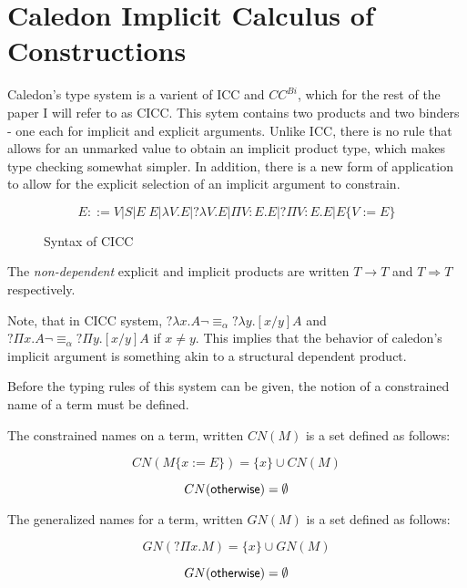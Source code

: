 \section{Caledon Implicit Calculus of Constructions}

Caledon's type system is a varient of ICC and $CC^{Bi}$, 
which for the rest of the paper I will refer to as CICC.  
This sytem contains two products and two binders - one each for implicit and explicit arguments. 
Unlike ICC, there is no rule that allows for an unmarked value to obtain an implicit product type, which
makes type checking somewhat simpler.  
In addition, there is a new form of application to allow for the explicit
selection of an implicit argument to constrain.

\begin{figure}[h]
\[ 
E ::= 
V 
| S 
| E\;E 
| \lambda V . E 
| ?\lambda V . E 
| \Pi V : E . E 
| ?\Pi V : E . E 
| E \{ V := E \}
\]

\caption{Syntax of CICC}
\label{cicc:syntax}
\end{figure}

The \textit{non-dependent} explicit and implicit products are written $T \rightarrow T$ 
and $T \Rightarrow T$ respectively.


Note, that in CICC system, $?\lambda x . A \neg\equiv_\alpha ?\lambda y . [x / y] A$ 
and $?\Pi x . A \neg\equiv_\alpha ?\Pi y . [x / y] A$  if $x \neq y$.  This implies that the 
behavior of caledon's implicit argument is something akin to a structural dependent product.  


Before the typing rules of this system can be given, the notion of a constrained name of a term must be defined.

\begin{definition}
The constrained names on a term, written $CN(M)$ is a set defined as follows:

\[ 
CN(M \{ x := E \}) = \{ x \} \cup CN(M)
\]

\[ 
CN(\mathsf{otherwise}) = \emptyset
\]

\end{definition}

\begin{definition}
The generalized names for a term, written $GN(M)$ is a set defined as follows:

\[ 
GN(?\Pi x . M) = \{ x \} \cup GN(M)
\]

\[ 
GN(\mathsf{otherwise}) = \emptyset
\]

\end{definition}

